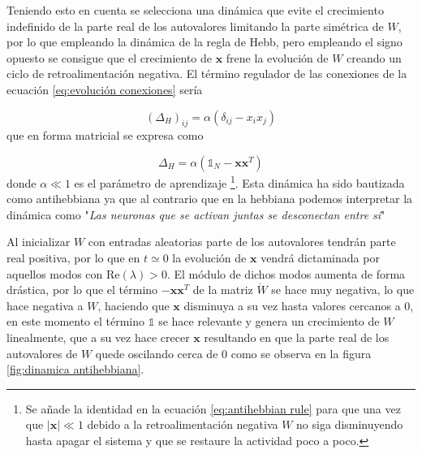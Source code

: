 \documentclass[11pt,a4paper,twoside,pdf]{article}
\numberwithin{equation}{section}
\newcommand{\re}{\text{Re}}
\begin{document}
Teniendo esto en cuenta se selecciona una dinámica que evite el crecimiento indefinido de la parte real de los autovalores limitando la parte simétrica de \(W\), por lo que empleando la dinámica de la regla de Hebb, pero empleando el signo opuesto \parencite{magnasco2009} se consigue que el crecimiento de \(\mathbf{x}\) frene la evolución de \(W\) creando un ciclo de retroalimentación negativa. El término regulador de las conexiones de la ecuación \eqref{eq:evolución conexiones} sería

\begin{equation}
  (\Delta_H)_{ij} = \alpha(\delta_{ij} - x_i x_j)
\end{equation}
que en forma matricial se expresa como 

\begin{equation}
  \Delta_H = \alpha\left(\mathbb{1}_N - \mathbf{xx}^T\right)
  \label{eq:antihebbian rule}
\end{equation}
donde \(\alpha \ll 1\) es el parámetro de aprendizaje \footnote{Se añade la identidad en la ecuación \eqref{eq:antihebbian rule} para que una vez que \(|\mathbf{x}| \ll 1\) debido a la retroalimentación negativa \(W\) no siga disminuyendo hasta apagar el sistema y que se restaure la actividad poco a poco.}. Esta dinámica ha sido bautizada como antihebbiana ya que al contrario que en la hebbiana podemos interpretar la dinámica como "\emph{Las neuronas que se activan juntas se desconectan entre sí}"

Al inicializar \(W\) con entradas aleatorias parte de los autovalores tendrán parte real positiva, por lo que en \(t \simeq 0\) la evolución de \(\mathbf{x}\) vendrá dictaminada por aquellos modos con \(\re(\lambda) > 0\). El módulo de dichos modos aumenta de forma drástica, por lo que el término \(-\mathbf{xx}^T\) de la matriz \(\dot{W}\) se hace muy negativa, lo que hace negativa a \(W\), haciendo que \(\mathbf{x}\) disminuya a su vez hasta valores cercanos a 0, en este momento el término \(\mathbb{1}\) se hace relevante y genera un crecimiento de \(W\) linealmente, que a su vez hace crecer \(\mathbf{x}\) resultando en que la parte real de los autovalores de \(W\) quede oscilando cerca de 0 \parencite{magnasco2009} como se observa en la figura \ref{fig:dinamica antihebbiana}.
\end{document}

